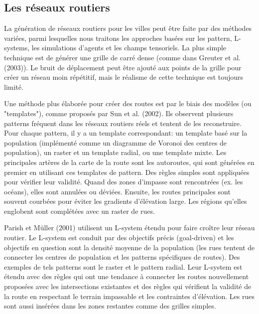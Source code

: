 \documentclass[11pt]{article}
\begin{document}
\subsection{Les réseaux routiers}

La génération de réseaux routiers pour les villes peut être faite par des méthodes variées, parmi lesquelles nous traitons les approches basées sur les pattern, L-systems, les simulations d'agents et les champs tensoriels. La plus simple technique est de générer une grille de carré dense (comme dans Greuter et al. (2003)). Le bruit de déplacement peut être ajouté aux points de la grille pour créer un réseau moin répétitif, mais le réalisme de cette technique est toujours limité. \newline

Une méthode plus élaborée pour créer des routes est par le biais des modèles (ou "templates"), comme proposés par Sun et al. (2002). Ils observent plusieurs patterns fréquent dans les réseaux routiers réels et tentent de les reconstruire. Pour chaque pattern, il y a un template correspondant: un template basé sur la population (implémenté comme un diagramme de Voronoi des centres de population), un raster et un template radial, ou une template mixte. Les principales artères de la carte de la route sont les autoroutes, qui sont générées en premier en utilisant ces templates de pattern. Des règles simples sont appliquées pour vérifier leur validité. Quand des zones d'impasse sont rencontrées (ex. les océans), elles sont annulées ou déviées. Ensuite, les routes principales sont souvent courbées pour éviter les gradients d'élévation large. Les régions qu'elles englobent sont complétées avec un raster de rues. \newline

Parish et Müller (2001) utilisent un L-system étendu pour faire croître leur réseau routier. Le L-system est conduit par des objectifs précis (goal-driven) et les objectifs en question sont la densité moyenne de la population (les rues tentent de connecter les centres de population et les patterns spécifiques de routes). Des exemples de tels patterns sont le raster et le pattern radial. Leur L-system est étendu avec des règles qui ont une tendance à connecter les routes nouvellement proposées avec les intersections existantes et des règles qui vérifient la validité de la route en respectant le terrain impassable et les contraintes d'élévation. Les rues sont aussi insérées dans les zones restantes comme des grilles simples. \newline
\end{document}
